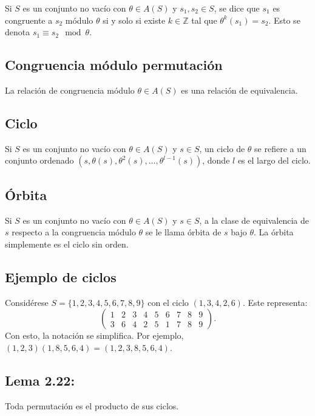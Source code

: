 \documentclass{article}
\begin{document}
Si $S$ es un conjunto no vacío con $\theta\in A(S)$ y $s_1,s_2\in S$, se dice que $s_1$ es congruente a $s_2$ módulo $\theta$ si y solo si existe $k\in\mathbb{Z}$ tal que $\theta^k(s_1)=s_2$. Esto se denota $s_1\equiv s_2\mod \theta$.

\subsection*{\color{purple} Congruencia módulo permutación}

La relación de congruencia módulo $\theta\in A(S)$ es una relación de equivalencia.

\subsection*{\color{violet} Ciclo}

Si $S$ es un conjunto no vacío con $\theta\in A(S)$ y $s\in S$, un ciclo de $\theta$ se refiere a un conjunto ordenado $(s,\theta(s),\theta^2(s),\ldots,\theta^{l-1}(s))$, donde $l$ es el largo del ciclo.

\subsection*{\color{violet} Órbita}

Si $S$ es un conjunto no vacío con $\theta\in A(S)$ y $s\in S$, a la clase de equivalencia de $s$ respecto a la congruencia módulo $\theta$ se le llama órbita de $s$ bajo $\theta$. La órbita simplemente es el ciclo sin orden.

\subsection*{\color{teal} Ejemplo de ciclos}

Considérese $S=\{1,2,3,4,5,6,7,8,9\}$ con el ciclo $(1,3,4,2,6)$. Este representa:
$$
\begin{pmatrix}
1 & 2 & 3 & 4 & 5 & 6 & 7 & 8 & 9\\
3 & 6 & 4 & 2 & 5 & 1 & 7 & 8 & 9
\end{pmatrix}.
$$
Con esto, la notación se simplifica. Por ejemplo, $(1,2,3)(1,8,5,6,4)=(1,2,3,8,5,6,4)$.

\subsection*{\color{blue} Lema 2.22:}

Toda permutación es el producto de sus ciclos.
\end{document}
